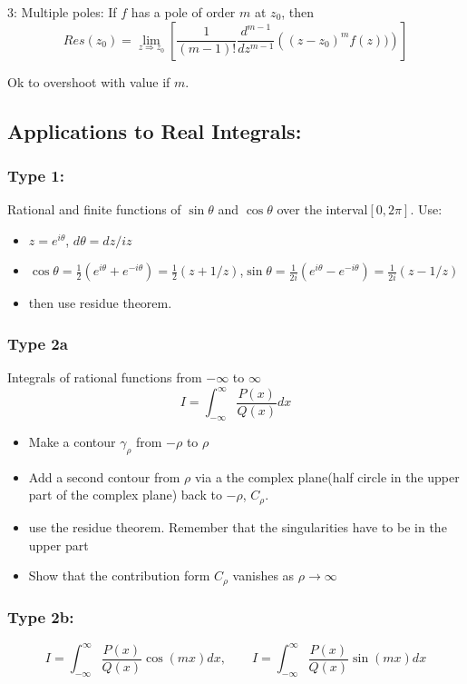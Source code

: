 \documentclass[a4paper,norsk, 10pt]{article}
\begin{document}
3: Multiple poles:
If $f$ has a pole of order $m$ at $z_0$, then
\begin{equation}
Res(z_0) = \lim_{z \Rightarrow z_0}\left[\frac{1}{(m-1)!}\frac{d^{m-1}}{dz^{m-1}}\left((z-z_0)^mf(z))\right)\right]
\end{equation}

Ok to overshoot with value if $m$.

\subsection{Applications to Real Integrals:}
\subsubsection{Type 1:}
Rational and finite functions of $\sin\theta$ and $\cos\theta$ over the interval$[0,2\pi]$. Use:
\begin{itemize}
\item $z = e^{i\theta}$, \qquad$d\theta = dz/iz$
\item $\cos\theta = \frac{1}{2}(e^{i\theta} + e^{-i\theta}) = \frac{1}{2}(z+1/z)$,\qquad $\sin\theta = \frac{1}{2i}(e^{i\theta} - e^{-i\theta}) = \frac{1}{2i}(z-1/z)$
\item then use residue theorem.
\end{itemize}
\subsubsection{Type 2a}
Integrals of rational functions from $-\infty$ to $\infty$
\begin{equation}
I = \int_{-\infty}^{\infty} \frac{P(x)}{Q(x)}dx
\end{equation}
\begin{itemize}
\item Make a contour $\gamma_{\rho}$ from $-\rho$ to $\rho$
\item Add a second contour from $\rho$ via a the complex plane(half circle in the upper part of the complex plane) back to $-\rho$, $C_{\rho}$.
\item use the residue theorem. Remember that the singularities have to be in the upper part
\item Show that the contribution form $C_{\rho}$ vanishes as $\rho \rightarrow \infty$
\end{itemize}

\subsubsection{Type 2b:}
\begin{equation}
I = \int_{-\infty}^{\infty} \frac{P(x)}{Q(x)}\cos(mx)dx, \qquad I = \int_{-\infty}^{\infty} \frac{P(x)}{Q(x)}\sin(mx)dx
\end{equation}
\end{document}
